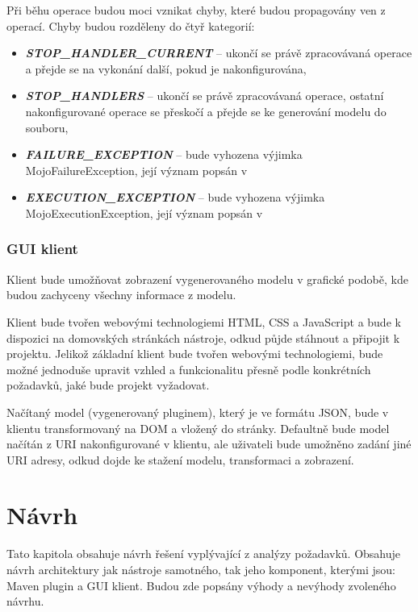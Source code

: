 \documentclass[11pt,twoside,a4paper]{book}
\begin{document}
Při běhu operace budou moci vznikat chyby, které budou propagovány ven z operací. Chyby
budou rozděleny do čtyř kategorií:

\begin{itemize}
  \item \textbf{\textit{STOP\_HANDLER\_CURRENT}} – ukončí se právě zpracovávaná operace a přejde
  se na vykonání další, pokud je nakonfigurována,
  \item \textbf{\textit{STOP\_HANDLERS}} – ukončí se právě
  zpracovávaná operace, ostatní nakonfigurované operace se přeskočí a přejde se ke generování modelu do souboru,
  \item \textbf{\textit{FAILURE\_EXCEPTION}} – bude
  vyhozena výjimka MojoFailureException, její význam popsán v  \cite{Maven08}
  \item \textbf{\textit{EXECUTION\_EXCEPTION}} – bude
  vyhozena výjimka MojoExecutionException, její význam popsán v  \cite{Maven08}
\end{itemize}

\subsection{GUI klient}

Klient bude umožňovat zobrazení vygenerovaného modelu v grafické podobě, kde budou
zachyceny všechny informace z modelu.

Klient bude tvořen webovými technologiemi HTML, CSS a JavaScript a bude k dispozici na
domovských stránkách nástroje, odkud půjde stáhnout a připojit k projektu. Jelikož základní
klient bude tvořen webovými technologiemi, bude možné jednoduše upravit vzhled a
funkcionalitu přesně podle konkrétních požadavků, jaké bude projekt vyžadovat.

Načítaný model (vygenerovaný pluginem), který je ve formátu JSON, bude v klientu
transformovaný na DOM a vložený do stránky. Defaultně bude model načítán z URI
nakonfigurované v klientu, ale uživateli bude umožněno zadání jiné URI adresy,
odkud dojde ke stažení modelu, transformaci a zobrazení.

\chapter{Návrh}

Tato kapitola obsahuje návrh řešení vyplývající z analýzy požadavků. Obsahuje návrh
architektury jak nástroje samotného, tak jeho komponent, kterými jsou: Maven plugin a GUI
klient. Budou zde popsány výhody a nevýhody zvoleného návrhu.
\end{document}
